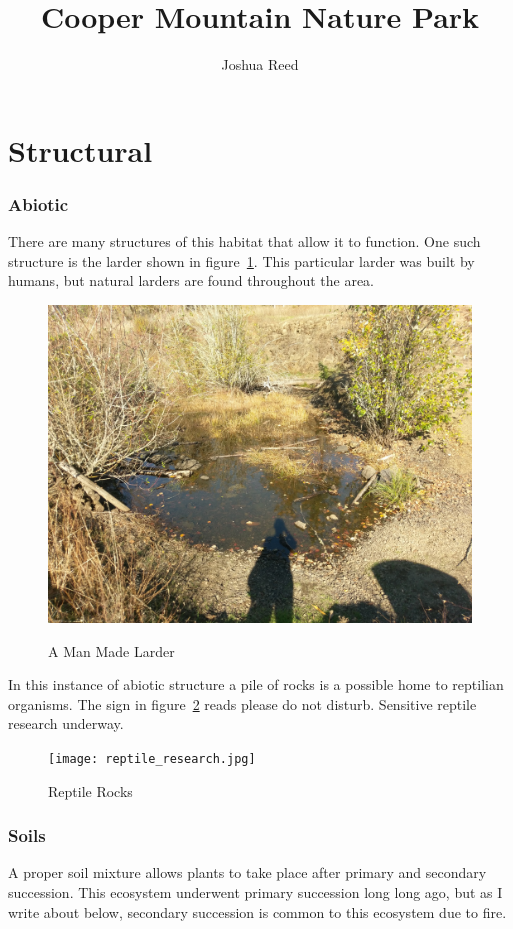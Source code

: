 \documentclass{article}
\author{Joshua Reed}
\title{Cooper Mountain Nature Park}
\begin{document}
\maketitle{}
\section{Structural}
\subsubsection{Abiotic}\label{ssub:abiotic}
There are many structures of this habitat that allow it to function. One such structure
is the larder shown in figure~\ref{larder}. This particular larder was built by humans,
but natural larders are found throughout the area.
\begin{figure}[H]
\centering{}
\caption{A Man Made Larder}
\includegraphics[scale=0.07]{larder.jpg}
\label{larder}
\end{figure}
\newpage

In this instance of abiotic structure a pile of rocks is a possible home to 
reptilian organisms. The sign in figure~\ref{rocks} reads please do not disturb. 
Sensitive reptile research underway.
\begin{figure}[H]
\centering{}
\caption{Reptile Rocks}
\texttt{[image: reptile\_research.jpg]}
\label{rocks}
\end{figure}


\subsubsection{Soils}
A proper soil mixture allows plants to take place after primary and secondary succession.
This ecosystem underwent primary succession long long ago, but as I  write about
below, secondary succession is common to this ecosystem due to fire. 
\end{document}
